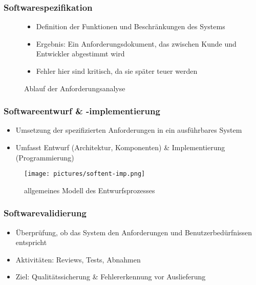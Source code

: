 \documentclass[12pt,a4paper,oneside]{article}
\begin{document}
\subsubsection{Softwarespezifikation}

\begin{figure}[H]
\begin{minipage}[t]{0.45\textwidth}
\begin{itemize}
\item Definition der Funktionen und Beschränkungen des Systems
\item Ergebnis: Ein Anforderungsdokument, das zwischen Kunde und Entwickler abgestimmt wird
\item Fehler hier sind kritisch, da sie später teuer werden
\end{itemize}
\end{minipage}
\hfill
\begin{minipage}[t]{0.45\textwidth}
\centering
\vspace{-15mm}
\caption{Ablauf der Anforderungsanalyse}
\end{minipage}
\end{figure}

\newpage

\subsubsection{Softwareentwurf \& -implementierung}

\begin{itemize}
\item Umsetzung der spezifizierten Anforderungen in ein ausführbares System
\item Umfasst Entwurf (Architektur, Komponenten) \& Implementierung (Programmierung)
\end{itemize}

\begin{figure}[H]
\centering
\texttt{[image: pictures/softent-imp.png]}
\caption{allgemeines Modell des Entwurfsprozesses}
\end{figure}

\subsubsection{Softwarevalidierung}
\begin{itemize}
\item Überprüfung, ob das System den Anforderungen und Benutzerbedürfnissen entspricht
\item Aktivitäten: Reviews, Tests, Abnahmen
\item Ziel: Qualitätssicherung \& Fehlererkennung vor Auslieferung
\end{itemize}
\end{document}

